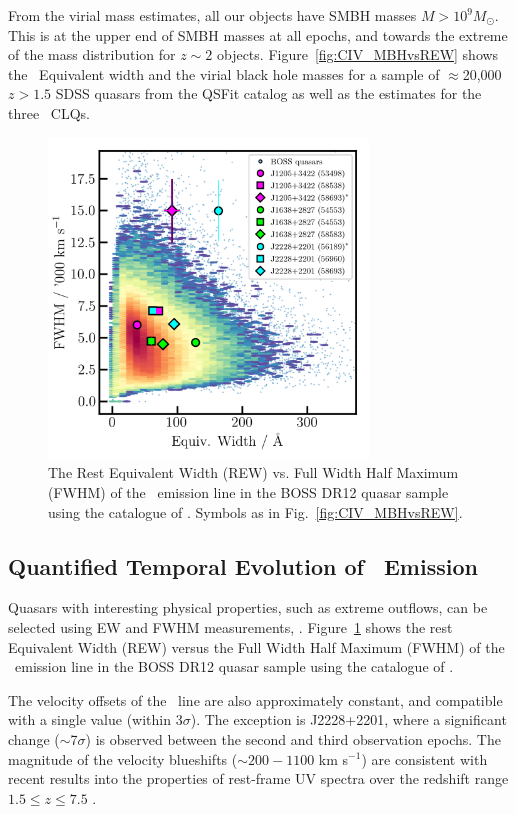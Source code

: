 \documentclass[fleqn,usenatbib]{mnras}
\begin{document}
From the virial mass estimates, all our objects have SMBH masses $M
>10^{9} M_{\odot}$.  This is at the upper end of SMBH masses at all
epochs, and towards the extreme of the mass distribution for $z\sim2$
objects.  Figure~\ref{fig:CIV_MBHvsREW} shows the \civ\ Equivalent
width and the virial black hole masses for a sample of $\approx$20,000
$z>1.5$ SDSS quasars from the QSFit catalog as well as the estimates
for the three \civ\ CLQs.



\begin{figure}
  \centering
  \includegraphics[width=8.5cm, trim=0.2cm 0.2cm 0.0cm 0.2cm, clip]
  {figures/CIV_CLQs_REWvsFWHM_20191128.png}
  \vspace{-12pt}
  \caption[]{The Rest Equivalent Width (REW) vs. Full Width Half Maximum (FWHM) 
    of the \civ\ emission line in the BOSS DR12 quasar sample using the catalogue 
    of \citet{Hamann2017}.
   Symbols as in Fig.~\ref{fig:CIV_MBHvsREW}.}
  \label{fig:REWvsFWHM}
\end{figure}
\subsection{Quantified Temporal Evolution of \civ\ Emission}
Quasars with interesting physical properties, such as extreme
outflows, can be selected using EW and FWHM measurements, \citep[e.g.,
the ``Extremely Red Quasars'' (ERQs)][]{Ross2015, Zakamska2016,
Hamann2017, Zakamska2019}. Figure~\ref{fig:REWvsFWHM} shows the rest
Equivalent Width (REW) versus the Full Width Half Maximum (FWHM) of
the \civ\ emission line in the BOSS DR12 quasar sample using the
catalogue of \citet{Hamann2017}.

The velocity offsets of the \civ\ line are also
approximately constant, and compatible with a single value (within
3$\sigma$).  The exception is J2228+2201, where a significant change
($\sim$7$\sigma$) is observed between the second and third observation
epochs. The magnitude of the velocity blueshifts ($\sim200-1100$ km s$^{-1}$)
are consistent with recent results into the properties of 
rest-frame UV spectra over the redshift range $1.5 \leq z \leq 7.5$
\citep{Meyer2019}. 
\end{document}
